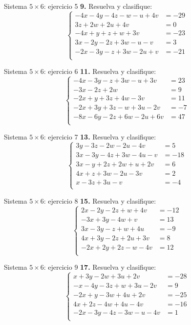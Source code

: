 \documentclass[aspectratio=169]{beamer}
\begin{document}
\begin{frame}{Sistema $5\times 6$: ejercicio 5}
\scriptsize
\textbf{9.} Resuelva y clasifique:
\[\left\{\begin{aligned}
-4x-4y-4z-w-u+4v&=-29\\
3z+2w+2u+4v&=0\\
-4x+y+z+w+3v&=-23\\
3x-2y-2z+3w-u-v&=3\\
-2x-3y-z+3w-2u+v&=-21\\
\end{aligned}\right.\]
\end{frame}
\begin{frame}{Sistema $5\times 6$: ejercicio 6}
\scriptsize
\textbf{11.} Resuelva y clasifique:
\[\left\{\begin{aligned}
-4x-3y-z+3w-u+3v&=23\\
-3x-2z+2w&=9\\
-2x+y+3z+4w-3v&=11\\
-2x+3y+3z-w+3u-2v&=-7\\
-8x-6y-2z+6w-2u+6v&=47\\
\end{aligned}\right.\]
\end{frame}
\begin{frame}{Sistema $5\times 6$: ejercicio 7}
\scriptsize
\textbf{13.} Resuelva y clasifique:
\[\left\{\begin{aligned}
3y-3z-2w-2u-4v&=5\\
3x-3y-4z+3w-4u-v&=-18\\
3x-y+2z+2w+u+2v&=6\\
4x+z+3w-2u-3v&=2\\
x-3z+3u-v&=-4\\
\end{aligned}\right.\]
\end{frame}
\begin{frame}{Sistema $5\times 6$: ejercicio 8}
\scriptsize
\textbf{15.} Resuelva y clasifique:
\[\left\{\begin{aligned}
2x-2y-2z+w+4v&=-12\\
-3x+3y-4w+v&=13\\
3x-3y-z+w+4u&=-9\\
4x+3y-2z+2u+3v&=8\\
-2x+2y+2z-w-4v&=12\\
\end{aligned}\right.\]
\end{frame}
\begin{frame}{Sistema $5\times 6$: ejercicio 9}
\scriptsize
\textbf{17.} Resuelva y clasifique:
\[\left\{\begin{aligned}
x+3y-2w+3u+2v&=-28\\
-x-4y-3z+w+3u-2v&=9\\
-2x+y-3w+4u+2v&=-25\\
4x+2z-4w+4u-4v&=-16\\
-2x-3y-4z-3w-u-4v&=1\\
\end{aligned}\right.\]
\end{frame}
\end{document}
